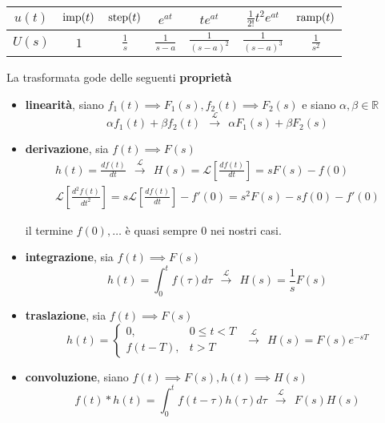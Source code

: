\begin{center}
	
	\begin{tabular}{ccccccc}
		\toprule 
		$u(t)$ & $\operatorname{imp}(t)$ & $\operatorname{step}(t)$     & $e^{at}$        & $te^{at}$           & $\frac{1}{2!} t^2 e^{at}$ & $\operatorname{ramp}(t)$      \\
		\midrule 
		$U(s)$ & $1$       & $\frac{1}{s}$ & $\frac{1}{s-a}$ & $\frac{1}{(s-a)^2}$ & $\frac{1}{(s-a)^3}$       & $\frac{1}{s^2}$ \\
		\bottomrule
	\end{tabular}
\end{center}

La trasformata gode delle seguenti \textbf{proprietà}
\begin{itemize}
	\item \textbf{linearità}, siano $f_1(t)\implies F_1(s) ,f_2(t)\implies F_2(s)$ e siano $\alpha ,\beta \in \mathbb{R}$\begin{equation*}
	      \alpha f_1(t) +\beta f_2(t) \ \ \xrightarrow{\mathcal{L}} \ \ \alpha F_1(s) +\beta F_2(s)
	\end{equation*}
	\item \textbf{derivazione}, sia $f(t)\implies F(s)$\begin{gather*}
	      h(t) =\frac{df(t)}{dt} \ \ \xrightarrow{\mathcal{L}} \ \ H(s) =\mathcal{L}\left[\frac{df(t)}{dt}\right] =sF(s) -f(0)\\
	      \mathcal{L}\left[\frac{d^2 f(t)}{dt^2}\right] =s\mathcal{L}\left[\frac{df(t)}{dt}\right] -f'(0) =s^2 F(s) -sf(0) -f'(0)
	\end{gather*}
	
	il termine $f(0) ,\dotsc $ è quasi sempre $0$ nei nostri casi.
	\item \textbf{integrazione}, sia $f(t)\implies F(s)$\begin{equation*}
	      h(t) =\int ^t_0 f(\tau) d\tau \ \ \xrightarrow{\mathcal{L}} \ \ H(s) =\frac{1}{s} F(s)
	\end{equation*}
	\item \textbf{traslazione}, sia $f(t)\implies F(s)$\begin{equation}
	      h(t) =\begin{cases}
	      0, & 0\leq t< T\\
	      f(t-T) , & t >T
	\end{cases} \ \ \xrightarrow{\mathcal{L}
		} \ \ H(s) =F(s) e^{-sT}
	\end{equation}
	\item \textbf{convoluzione}, siano $f(t)\implies F(s) ,h(t)\implies H(s)$\begin{equation*}
	      f(t) *h(t) =\int ^t_0 f(t-\tau) h(\tau) d\tau \ \ \xrightarrow{\mathcal{L}} \ \ F(s) H(s)
	\end{equation*}
\end{itemize}

